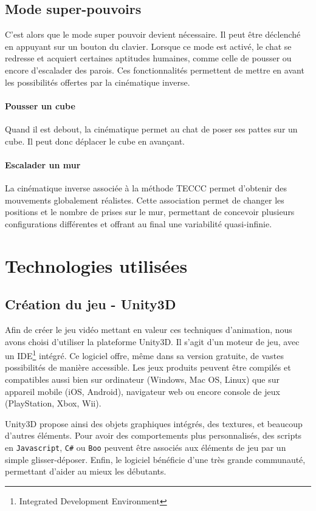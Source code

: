 \documentclass[a4paper,11pt]{article}
\begin{document}
\subsection{Mode super-pouvoirs}
C'est alors que le mode super pouvoir devient nécessaire. Il peut être déclenché en appuyant sur un bouton du clavier. Lorsque ce mode est activé, le chat se redresse et acquiert certaines aptitudes humaines, comme celle de pousser ou encore d'escalader des parois. Ces fonctionnalités permettent de mettre en avant les possibilités offertes par la cinématique inverse.

\paragraph{Pousser un cube}
Quand il est debout, la cinématique permet au chat de poser ses pattes sur un cube. Il peut donc déplacer le cube en avançant.
\paragraph{Escalader un mur}
La cinématique inverse associée à la méthode TECCC permet d'obtenir des mouvements globalement réalistes. Cette association permet de changer les positions et le nombre de prises sur le mur, permettant de concevoir plusieurs configurations différentes et offrant au final une variabilité quasi-infinie.

\section{Technologies utilisées}
\subsection{Création du jeu - Unity3D}

Afin de créer le jeu vidéo mettant en valeur ces techniques d'animation, nous avons choisi d'utiliser la plateforme Unity3D. Il s'agit d'un moteur de jeu, avec un IDE\footnote{Integrated Development Environment} intégré. Ce logiciel offre, même dans sa version gratuite, de vastes possibilités de manière accessible. Les jeux produits peuvent être compilés et compatibles aussi bien sur ordinateur (Windows, Mac OS, Linux) que sur appareil mobile (iOS, Android), navigateur web ou encore console de jeux (PlayStation, Xbox, Wii).

Unity3D propose ainsi des objets graphiques intégrés, des textures, et beaucoup d'autres éléments. Pour avoir des comportements plus personnalisés, des scripts en \texttt{Javascript}, \texttt{C\#} ou \texttt{Boo} peuvent être associés aux éléments de jeu par un simple glisser-déposer. Enfin, le logiciel bénéficie d'une très grande communauté, permettant d'aider au mieux les débutants. 
\end{document}
